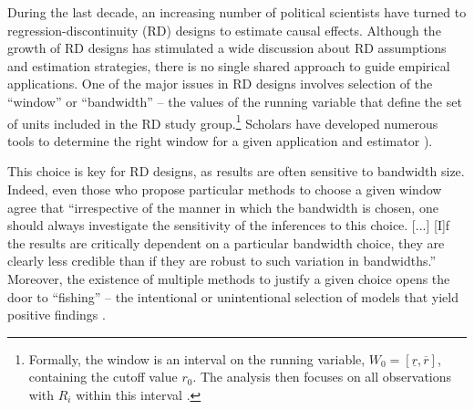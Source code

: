 \documentclass[letterpaper,twoside,12pt]{article}
\begin{document}
During the last decade, an increasing number of political scientists have turned to regression-discontinuity (RD) designs to estimate causal effects.  Although the growth of RD designs has stimulated a wide discussion about RD assumptions and estimation strategies, there is no single shared approach to guide empirical applications. One of the major issues in RD designs involves selection of the ``window'' or ``bandwidth'' -- the values of the running variable that define the set of units included in the RD study group.\footnote{Formally, the window is an interval on the running variable, $W_0=[\underline{r},\overline{r}]$, containing the cutoff value $r_0$. The analysis then focuses on all observations with $R_i$ within this interval \citep{cattaneo2014randomization}.} Scholars have developed numerous tools to determine the right window for a given application and  estimator \citep{imbens2008regression,imbens2011optimal,calonico2015robust}). 

This choice is key for RD designs, as results are often sensitive to bandwidth size. Indeed, even those who propose particular methods to choose a given window agree that ``irrespective of the manner in which the bandwidth is chosen, one should always investigate the sensitivity of the inferences to this choice. [...] [I]f the results are critically dependent on a particular bandwidth choice, they are clearly less credible than if they are robust to such variation in bandwidths.'' \citep[p.~633]{imbens2008regression} Moreover, the existence of multiple methods to justify a given choice opens the door to ``fishing'' -- the intentional or unintentional selection of models that yield positive findings \citep{Humphreys01012013}. 
\end{document}
